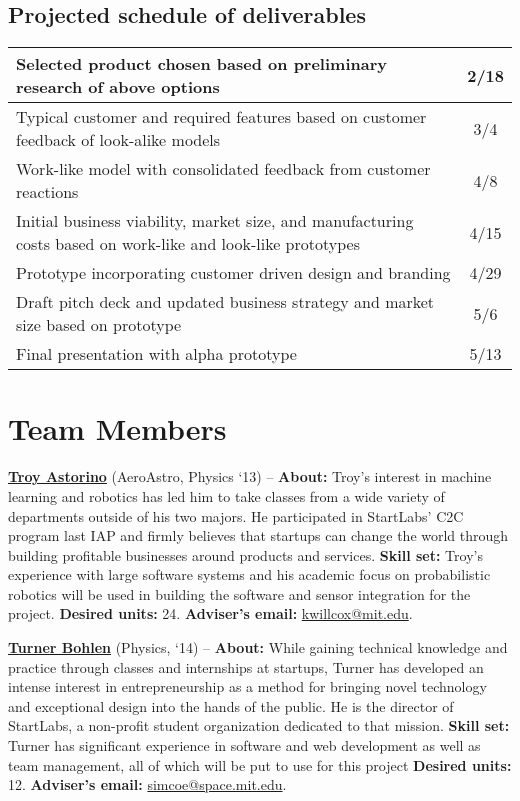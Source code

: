 \documentclass[8pt]{article}
\begin{document}
\subsection*{Projected schedule of deliverables}

\begin{tabular}{>{\RaggedLeft}p{6in} | c}
Selected product chosen based on preliminary research of above options & 2/18 \\ \hline
Typical customer and required features based on customer feedback of look-alike models & 3/4 \\ \hline
Work-like model with consolidated feedback from customer reactions & 4/8 \\ \hline
Initial business viability, market size, and manufacturing costs based on work-like and look-like prototypes & 4/15 \\ \hline
Prototype incorporating customer driven design and branding & 4/29 \\ \hline
Draft pitch deck and updated business strategy and market size based on prototype & 5/6 \\ \hline
Final presentation with alpha prototype & 5/13 \\ 

\end{tabular}

\section*{Team Members}

\noindent \textbf{\href{http://www.troyastorino.com}{Troy Astorino}} (AeroAstro,
Physics `13) -- \textbf{About:} Troy's interest in machine learning and robotics
has led him to take classes from a wide variety of departments outside of his
two majors. He participated in StartLabs' C2C program last IAP and firmly
believes that startups can change the world through building profitable
businesses around products and services. \textbf{Skill set:} Troy's experience
with large software systems and his academic focus on probabilistic robotics
will be used in building the software and sensor integration for the project.
\textbf{Desired units:} 24. \textbf{Adviser's email:}
\href{mailto:kwillcox@mit.edu}{kwillcox@mit.edu}.

\vspace{.25cm}

\noindent \textbf{\href{http://www.turnerbohlen.com}{Turner Bohlen}} (Physics,
`14) -- \textbf{About:} While gaining technical knowledge and practice through
classes and internships at startups, Turner has developed an intense interest in
entrepreneurship as a method for bringing novel technology and exceptional
design into the hands of the public. He is the director of StartLabs, a
non-profit student organization dedicated to that mission. \textbf{Skill set:}
Turner has significant experience in software and web development as well as
team management, all of which will be put to use for this project \textbf{Desired units:} 12.
\textbf{Adviser's email:}
\href{mailto:simcoe@space.mit.edu}{simcoe@space.mit.edu}.
\end{document}
